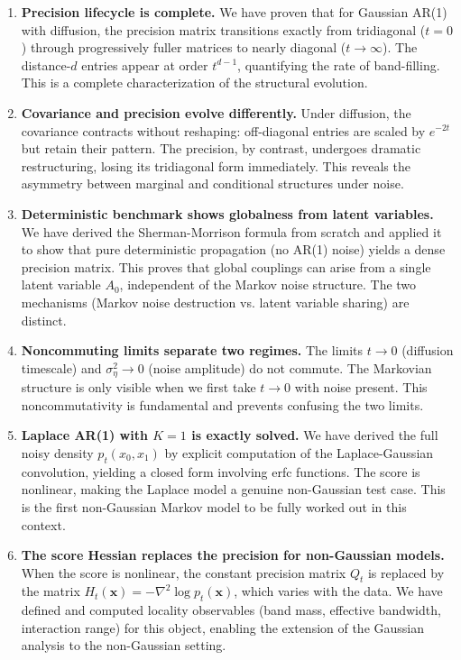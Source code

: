 \documentclass[11pt,a4paper]{article}
\theoremstyle{plain}
\theoremstyle{definition}
\newcommand{\Prec}{Q}
\newcommand{\vct}[1]{\mathbf{#1}}
\begin{document}
\begin{enumerate}

\item \textbf{Precision lifecycle is complete.}
We have proven that for Gaussian AR(1) with diffusion, the precision matrix transitions exactly from tridiagonal ($t=0$) through progressively fuller matrices to nearly diagonal ($t \to \infty$). The distance-$d$ entries appear at order $t^{d-1}$, quantifying the rate of band-filling. This is a complete characterization of the structural evolution.

\item \textbf{Covariance and precision evolve differently.}
Under diffusion, the covariance contracts without reshaping: off-diagonal entries are scaled by $e^{-2t}$ but retain their pattern. The precision, by contrast, undergoes dramatic restructuring, losing its tridiagonal form immediately. This reveals the asymmetry between marginal and conditional structures under noise.

\item \textbf{Deterministic benchmark shows globalness from latent variables.}
We have derived the Sherman-Morrison formula from scratch and applied it to show that pure deterministic propagation (no AR(1) noise) yields a dense precision matrix. This proves that global couplings can arise from a single latent variable $A_0$, independent of the Markov noise structure. The two mechanisms (Markov noise destruction vs. latent variable sharing) are distinct.

\item \textbf{Noncommuting limits separate two regimes.}
The limits $t \to 0$ (diffusion timescale) and $\sigma_\eta^2 \to 0$ (noise amplitude) do not commute. The Markovian structure is only visible when we first take $t \to 0$ with noise present. This noncommutativity is fundamental and prevents confusing the two limits.

\item \textbf{Laplace AR(1) with $K=1$ is exactly solved.}
We have derived the full noisy density $p_t(x_0, x_1)$ by explicit computation of the Laplace-Gaussian convolution, yielding a closed form involving erfc functions. The score is nonlinear, making the Laplace model a genuine non-Gaussian test case. This is the first non-Gaussian Markov model to be fully worked out in this context.

\item \textbf{The score Hessian replaces the precision for non-Gaussian models.}
When the score is nonlinear, the constant precision matrix $\Prec_t$ is replaced by the matrix $H_t(\vct{x}) = -\nabla^2\log p_t(\vct{x})$, which varies with the data. We have defined and computed locality observables (band mass, effective bandwidth, interaction range) for this object, enabling the extension of the Gaussian analysis to the non-Gaussian setting.


\end{enumerate}
\end{document}
